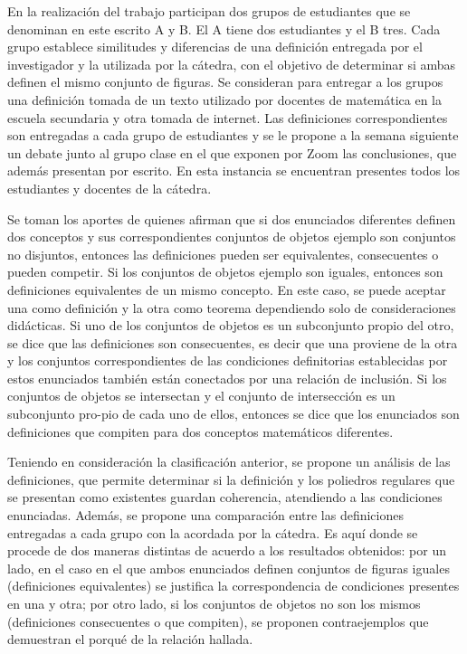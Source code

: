 \documentclass[oneside,spanish]{amsart}
\numberwithin{equation}{section}
\theoremstyle{definition}
\begin{document}
En la realización del trabajo participan dos grupos de estudiantes que se denominan en este escrito A y B. El A tiene dos estudiantes y el B tres. Cada grupo establece similitudes y diferencias de una definición entregada por el investigador y la utilizada por la cátedra, con el objetivo de determinar si ambas definen el mismo conjunto de figuras. Se consideran para entregar a los grupos una definición tomada de un texto utilizado por docentes de matemática en la escuela secundaria y otra tomada de internet. Las definiciones correspondientes son entregadas a cada grupo de estudiantes y se le propone a la semana siguiente un debate junto al grupo clase en el que exponen por Zoom las conclusiones, que además presentan por escrito. En esta instancia se encuentran presentes todos los estudiantes y docentes de la cátedra.

Se toman los aportes de \citet{winicki00} quienes afirman que si dos enunciados diferentes definen dos conceptos y sus correspondientes conjuntos de objetos ejemplo son conjuntos no disjuntos, entonces las definiciones pueden ser equivalentes, consecuentes o pueden competir. Si los conjuntos de objetos ejemplo son iguales, entonces son definiciones equivalentes de un mismo concepto. En este caso, se puede aceptar una como definición y la otra como teorema dependiendo solo de consideraciones didácticas. Si uno de los conjuntos de objetos es un subconjunto propio del otro, se dice que las definiciones son consecuentes, es decir que una proviene de la otra y los conjuntos correspondientes de las condiciones definitorias establecidas por estos enunciados también están conectados por una relación de inclusión. Si los conjuntos de objetos se intersectan y el conjunto de intersección es un subconjunto pro-pio de cada uno de ellos, entonces se dice que los enunciados son definiciones que compiten para dos conceptos matemáticos diferentes.

Teniendo en consideración la clasificación anterior, se propone un análisis de las definiciones, que permite determinar si la definición y los poliedros regulares que se presentan como existentes guardan coherencia, atendiendo a las condiciones enunciadas. Además, se propone una comparación entre las definiciones entregadas a cada grupo con la acordada por la cátedra. Es aquí donde se procede de dos maneras distintas de acuerdo a los resultados obtenidos: por un lado, en el caso en el que ambos enunciados definen conjuntos de figuras iguales (definiciones equivalentes) se justifica la correspondencia de condiciones presentes en una y otra; por otro lado, si los conjuntos de objetos no son los mismos (definiciones consecuentes o que compiten), se proponen contraejemplos que demuestran el porqué de la relación hallada.
\end{document}
